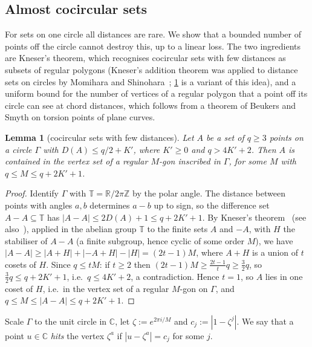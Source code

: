 \documentclass[11pt]{amsart}
\newtheorem{lemma}[theorem]{Lemma}
\theoremstyle{definition}
\theoremstyle{remark}
\newcommand{\R}{\mathbb{R}}
\begin{document}
\subsection{Almost cocircular sets}\label{sec:almostcoc}

For sets on one circle all distances are rare. We show that a bounded number of points off the circle cannot destroy this, up to a linear loss. The two ingredients are Kneser's theorem, which recognises cocircular sets with few distances as subsets of regular polygons (Kneser's addition theorem was applied to distance sets on circles by Momihara and Shinohara~\cite{MomiharaShinohara}; \cref{lem:kneser} is a variant of this idea), and a uniform bound for the number of vertices of a regular polygon that a point off its circle can see at chord distances, which follows from a theorem of Beukers and Smyth on torsion points of plane curves.

\begin{lemma}[cocircular sets with few distances]\label{lem:kneser}
Let $A$ be a set of $q\ge3$ points on a circle $\Gamma$ with $D(A)\le q/2+K'$, where $K'\ge0$ and $q>4K'+2$. Then $A$ is contained in the vertex set of a regular $M$-gon inscribed in $\Gamma$, for some $M$ with $q\le M\le q+2K'+1$.
\end{lemma}
\begin{proof}
Identify $\Gamma$ with $\mathbb T=\R/2\pi\mathbb Z$ by the polar angle. The distance between points with angles $a,b$ determines $a-b$ up to sign, so the difference set $A-A\subseteq\mathbb T$ has $|A-A|\le2D(A)+1\le q+2K'+1$. By Kneser's theorem~\cite{Kn53} (see also~\cite{TV06}), applied in the abelian group $\mathbb T$ to the finite sets $A$ and $-A$, with $H$ the stabiliser of $A-A$ (a finite subgroup, hence cyclic of some order $M$), we have $|A-A|\ge|A+H|+|{-A}+H|-|H|=(2t-1)M$, where $A+H$ is a union of $t$ cosets of $H$. Since $q\le tM$: if $t\ge2$ then $(2t-1)M\ge\frac{2t-1}{t}q\ge\frac32q$, so $\frac32q\le q+2K'+1$, i.e.\ $q\le4K'+2$, a contradiction. Hence $t=1$, so $A$ lies in one coset of $H$, i.e.\ in the vertex set of a regular $M$-gon on $\Gamma$, and $q\le M\le|A-A|\le q+2K'+1$.
\end{proof}

Scale $\Gamma$ to the unit circle in $\mathbb C$, let $\zeta:=e^{2\pi i/M}$ and $c_j:=|1-\zeta^j|$. We say that a point $u\in\mathbb C$ \emph{hits} the vertex $\zeta^a$ if $|u-\zeta^a|=c_j$ for some $j$.
\end{document}
